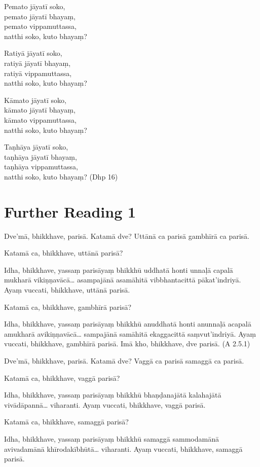 Pemato jāyatī soko,\\
pemato jāyatī bhayaṃ,\\
pemato vippamuttassa,\\
natthi soko, kuto bhayaṃ?

Ratiyā jāyatī soko,\\
ratiyā jāyatī bhayaṃ,\\
ratiyā vippamuttassa,\\
natthi soko, kuto bhayaṃ?

Kāmato jāyatī soko,\\
kāmato jāyatī bhayaṃ,\\
kāmato vippamuttassa,\\
natthi soko, kuto bhayaṃ?

Taṇhāya jāyatī soko,\\
taṇhāya jāyatī bhayaṃ,\\
taṇhāya vippamuttassa,\\
natthi soko, kuto bhayaṃ? \hfill(Dhp 16)

\section*{Further Reading 1}

Dve’mā, bhikkhave, parisā. Katamā dve? Uttānā ca parisā gambhīrā ca parisā.

Katamā ca, bhikkhave, uttānā parisā?

Idha, bhikkhave, yassaṃ parisāyaṃ bhikkhū uddhatā honti unnaḷā capalā mukharā vikiṇṇavācā… asampajānā asamāhitā vibbhantacittā pākat’indriyā. Ayaṃ vuccati, bhikkhave, uttānā parisā.

Katamā ca, bhikkhave, gambhīrā parisā?

Idha, bhikkhave, yassaṃ parisāyaṃ bhikkhū anuddhatā honti anunnaḷā acapalā amukharā avikiṇṇavācā… sampajānā samāhitā ekaggacittā saṃvut’indriyā. Ayaṃ vuccati, bhikkhave, gambhīrā parisā. Imā kho, bhikkhave, dve parisā. \hfill(A 2.5.1)

Dve’mā, bhikkhave, parisā. Katamā dve? Vaggā ca parisā samaggā ca parisā.

Katamā ca, bhikkhave, vaggā parisā?

Idha, bhikkhave, yassaṃ parisāyaṃ bhikkhū bhaṇḍanajātā kalahajātā vivādāpannā… viharanti. Ayaṃ vuccati, bhikkhave, vaggā parisā.

Katamā ca, bhikkhave, samaggā parisā?

Idha, bhikkhave, yassaṃ parisāyaṃ bhikkhū samaggā sammodamānā avivadamānā khīrodakībhūtā… viharanti. Ayaṃ vuccati, bhikkhave, samaggā parisā.

